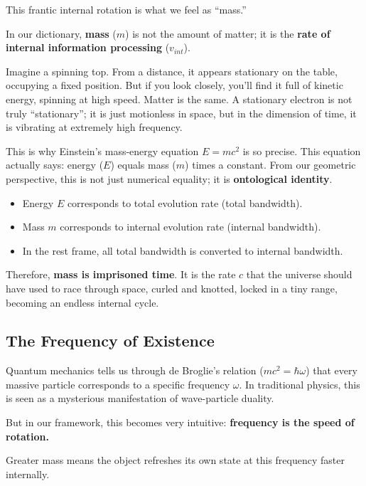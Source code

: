 \documentclass[11pt,a4paper,twoside]{book}
\begin{document}
This frantic internal rotation is what we feel as ``mass.''

In our dictionary, \textbf{mass} ($m$) is not the amount of matter; it is the \textbf{rate of internal information processing} ($v_{int}$).

Imagine a spinning top. From a distance, it appears stationary on the table, occupying a fixed position. But if you look closely, you'll find it full of kinetic energy, spinning at high speed. Matter is the same. A stationary electron is not truly ``stationary''; it is just motionless in space, but in the dimension of time, it is vibrating at extremely high frequency.

This is why Einstein's mass-energy equation $E=mc^2$ is so precise. This equation actually says: energy ($E$) equals mass ($m$) times a constant. From our geometric perspective, this is not just numerical equality; it is \textbf{ontological identity}.

\begin{itemize}
\item Energy $E$ corresponds to total evolution rate (total bandwidth).

\item Mass $m$ corresponds to internal evolution rate (internal bandwidth).

\item In the rest frame, all total bandwidth is converted to internal bandwidth.
\end{itemize}

Therefore, \textbf{mass is imprisoned time}. It is the rate $c$ that the universe should have used to race through space, curled and knotted, locked in a tiny range, becoming an endless internal cycle.

\subsection{The Frequency of Existence}

Quantum mechanics tells us through de Broglie's relation ($mc^2 = \hbar\omega$) that every massive particle corresponds to a specific frequency $\omega$. In traditional physics, this is seen as a mysterious manifestation of wave-particle duality.

But in our framework, this becomes very intuitive: \textbf{frequency is the speed of rotation.}

Greater mass means the object refreshes its own state at this frequency faster internally.
\end{document}
